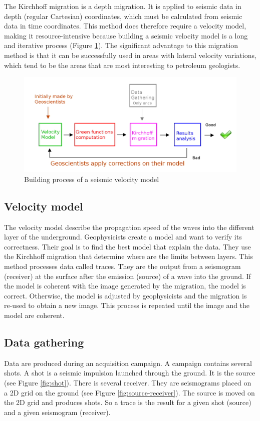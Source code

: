The Kirchhoff migration \cite{PingY1995} \cite{PTSCS2009} is a depth migration.
It is applied to seismic data in depth (regular Cartesian) coordinates, which must be calculated from seismic data in time coordinates.
This method does therefore require a velocity model, making it resource-intensive because building a seismic velocity model is a long and iterative process (Figure \ref{fig:kirchhoff-process}).
The significant advantage to this migration method is that it can be successfully used in areas with lateral velocity variations, which tend to be the areas that are most interesting to petroleum geologists.

\begin{figure}[H]
	\centering
	\includegraphics[scale=0.25]{kirchhoff-process}
	\caption{Building process of a seismic velocity model \label{fig:kirchhoff-process}}
\end{figure}

\subsection{Velocity model}
The velocity model describe the propagation speed of the waves into the different layer of the underground.
Geophysicists create a model and want to verify its correctness.
Their goal is to find the best model that explain the data.
They use the Kirchhoff migration that determine where are the limits between layers.
This method processes data called traces.
They are the output from a seismogram (receiver) at the surface after the emission (source) of a wave into the ground.
If the model is coherent with the image generated by the migration, the model is correct.
Otherwise, the model is adjusted by geophysicists and the migration is re-used to obtain a new image.
This process is repeated until the image and the model are coherent.

\subsection{Data gathering}
Data are produced during an acquisition campaign.
A campaign contains several shots.
A shot is a seismic impulsion launched through the ground.
It is the source (see Figure \ref{fig:shot}).
There is several receiver.
They are seismograms placed on a 2D grid on the ground (see Figure \ref{fig:source-receiver}).
The source is moved on the 2D grid and produces shots.
So a trace is the result for a given shot (source) and a given seismogram (receiver).

